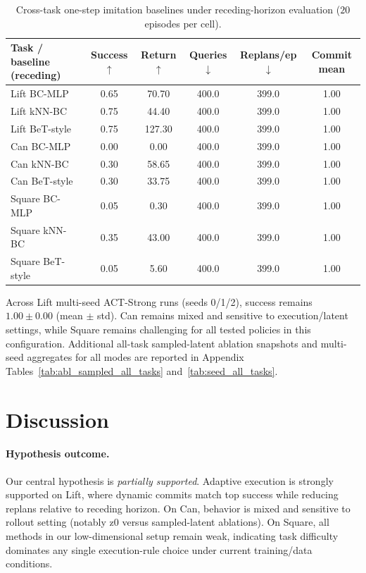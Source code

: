 \documentclass{article}
\begin{document}
\begin{table}[H]
\centering
\small
\begin{tabular}{@{}lccccc@{}}
\toprule
Task / baseline (receding) & Success $\uparrow$ & Return $\uparrow$ & Queries $\downarrow$ & Replans/ep $\downarrow$ & Commit mean \\
\midrule
Lift BC-MLP & 0.65 & 70.70 & 400.0 & 399.0 & 1.00 \\
Lift kNN-BC & 0.75 & 44.40 & 400.0 & 399.0 & 1.00 \\
Lift BeT-style & 0.75 & 127.30 & 400.0 & 399.0 & 1.00 \\
Can BC-MLP & 0.00 & 0.00 & 400.0 & 399.0 & 1.00 \\
Can kNN-BC & 0.30 & 58.65 & 400.0 & 399.0 & 1.00 \\
Can BeT-style & 0.30 & 33.75 & 400.0 & 399.0 & 1.00 \\
Square BC-MLP & 0.05 & 0.30 & 400.0 & 399.0 & 1.00 \\
Square kNN-BC & 0.35 & 43.00 & 400.0 & 399.0 & 1.00 \\
Square BeT-style & 0.05 & 5.60 & 400.0 & 399.0 & 1.00 \\
\bottomrule
\end{tabular}
\caption{Cross-task one-step imitation baselines under receding-horizon evaluation ($20$ episodes per cell).}
\label{tab:baseline_cross_task}
\end{table}

Across Lift multi-seed ACT-Strong runs (seeds 0/1/2), success remains $1.00 \pm 0.00$ (mean $\pm$ std). Can remains mixed and sensitive to execution/latent settings, while Square remains challenging for all tested policies in this configuration.
Additional all-task sampled-latent ablation snapshots and multi-seed aggregates for all modes are reported in Appendix Tables~\ref{tab:abl_sampled_all_tasks} and~\ref{tab:seed_all_tasks}.


\section{Discussion}
\paragraph{Hypothesis outcome.} Our central hypothesis is \emph{partially supported}. Adaptive execution is strongly supported on Lift, where dynamic commits match top success while reducing replans relative to receding horizon. On Can, behavior is mixed and sensitive to rollout setting (notably z0 versus sampled-latent ablations). On Square, all methods in our low-dimensional setup remain weak, indicating task difficulty dominates any single execution-rule choice under current training/data conditions.
\end{document}
